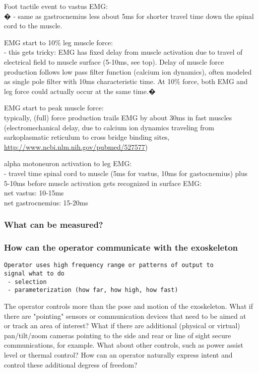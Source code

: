 \documentclass[letterpaper,12pt,fullpage]{article}
\begin{document}
Foot tactile event to vastus EMG:\\�
- same as gastrocnemius less about 5ms for shorter travel time down
the spinal cord to the muscle.

EMG start to 10\% leg muscle force:\\
- this gets tricky: EMG has fixed delay from muscle activation due to
travel of electrical field to muscle surface (5-10ms, see top). Delay
of muscle force production follows low pass filter function (calcium
ion dynamics), often modeled as single pole filter with 10ms
characteristic time. At 10\% force, both EMG and leg force could
actually occur at the same time.�

EMG start to peak muscle force:\\
typically, (full) force production trails EMG by about 30ms in fast
muscles (electromechanical delay, due to calcium ion dynamics
traveling from sarkoplasmatic reticulum to cross bridge binding
sites, \url{http://www.ncbi.nlm.nih.gov/pubmed/527577})

alpha motoneuron activation to leg EMG:\\
- travel time spinal cord to muscle (5ms for vastus, 10ms for
gastocnemius) plus 5-10ms before muscle activation gets recognized in
surface EMG:\\
net vastus: 10-15ms\\
net gastrocnemius: 15-20ms

\subsubsection{What can be measured?}

\subsubsection{How can the operator communicate with the exoskeleton}

\begin{verbatim}
Operator uses high frequency range or patterns of output to
signal what to do
 - selection
 - parameterization (how far, how high, how fast)
\end{verbatim}

The operator controls more than the pose and motion of the
exoskeleton. What if there are "pointing" sensors or communication
devices that need to be aimed at or track an area of interest? What if
there are additional (physical or virtual) pan/tilt/zoom cameras
pointing to the side and rear or line of sight secure communications,
for example. What about other controls, such as power assist level or
thermal control? How can an operator naturally express intent and
control these additional degress of freedom?
\end{document}
